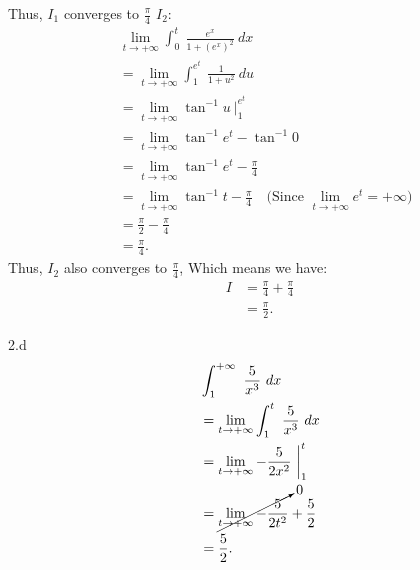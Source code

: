 \documentclass{report}
\begin{document}
    \bigbreak \noindent 
    Thus, $I_{1}$ converges to $\frac{\pi}{4}$
    \bigbreak \noindent 
    $I_{2}$:
    \begin{align*}
        &\lim\limits_{t \to +\infty}{\int_{0}^{t}\ \frac{e^{x}}{1+(e^{x})^{2}}\ dx} \\
        &=\lim\limits_{t \to +\infty}{\int_{1}^{e^{t}}\ \frac{1}{1+u^{2}}\ du} \\
        &=\lim\limits_{t \to +\infty}{\tan^{-1}{u}}\ \bigg|_1^{e^{t}} \\
        &=\lim\limits_{t \to +\infty}{\tan^{-1}{e^{t}}} - \tan^{-1}{0} \\
        &=\lim\limits_{t \to +\infty}{\tan^{-1}{e^{t}}} - \frac{\pi}{4} \\ 
        &=\lim\limits_{t \to +\infty}{\tan^{-1}{t}} - \frac{\pi}{4} \quad \text{(Since $\lim\limits_{t \to +\infty}{e^{t}} = +\infty $)} \\
        &=\frac{\pi}{2}-\frac{\pi}{4} \\
        &=\frac{\pi}{4}
    .\end{align*}
    \bigbreak \noindent 
    Thus, $I_{2}$ also converges to $\frac{\pi}{4}$, Which means we have:
    \begin{align*}
        I &= \frac{\pi}{4} + \frac{\pi}{4} \\
        &= \frac{\pi}{2} 
    .\end{align*}

    \pagebreak \bigbreak \noindent 
    2.d
    \begin{align*}
        &\int_{1}^{+\infty}\ \frac{5}{x^{3}}\ dx \\
        &=\lim\limits_{t \to +\infty}{\int_{1}^{t}\ \frac{5}{x^{3}}\ dx} \\
        &=\lim\limits_{t \to +\infty}{-\frac{5}{2x^{2}}}\ \bigg|_1^{t} \\
        &=\cancelto{0}{\lim\limits_{t \to +\infty}{-\frac{5}{2t^{2}}}} + \frac{5}{2} \\
        &=\frac{5}{2}
    .\end{align*}
\end{document}
